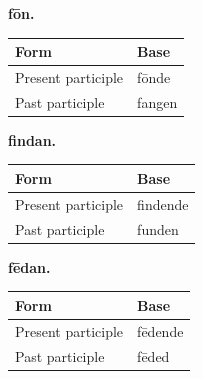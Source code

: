 \textbf{fōn.}

\par\begingroup
\fontsize{10.5}{13.2}\selectfont
\setlength{\LTleft}{0pt}\setlength{\LTright}{\fill}
\noindent
\begin{tabular}{@{}>{\raggedright\arraybackslash}p{69.84mm}>{\raggedright\arraybackslash}p{51.35mm}@{}}
\toprule
\textbf{Form} & \textbf{Base} \\
\midrule
Present participle & fōnde \\
Past participle & fangen \\
\bottomrule
\end{tabular}
\par\endgroup

\textbf{findan.}

\par\begingroup
\fontsize{10.5}{13.2}\selectfont
\setlength{\LTleft}{0pt}\setlength{\LTright}{\fill}
\noindent
\begin{tabular}{@{}>{\raggedright\arraybackslash}p{69.84mm}>{\raggedright\arraybackslash}p{51.35mm}@{}}
\toprule
\textbf{Form} & \textbf{Base} \\
\midrule
Present participle & findende \\
Past participle & funden \\
\bottomrule
\end{tabular}
\par\endgroup

\textbf{fēdan.}

\par\begingroup
\fontsize{10.5}{13.2}\selectfont
\setlength{\LTleft}{0pt}\setlength{\LTright}{\fill}
\noindent
\begin{tabular}{@{}>{\raggedright\arraybackslash}p{69.84mm}>{\raggedright\arraybackslash}p{51.35mm}@{}}
\toprule
\textbf{Form} & \textbf{Base} \\
\midrule
Present participle & fēdende \\
Past participle & fēded \\
\bottomrule
\end{tabular}
\par\endgroup

